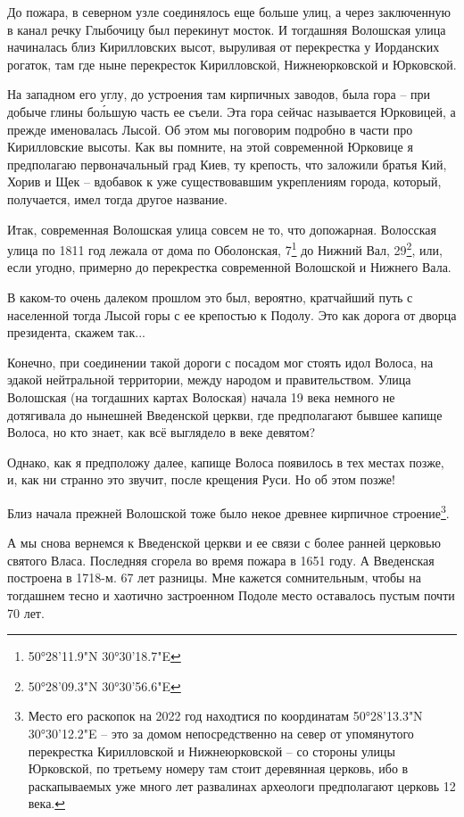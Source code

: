 До пожара, в северном узле соединялось еще больше улиц, а через заключенную в канал речку Глыбочицу был перекинут мосток. И тогдашняя Волошская улица начиналась близ Кирилловских высот, выруливая от перекрестка у Иорданских рогаток, там где ныне перекресток Кирилловской, Нижнеюрковской и Юрковской.

На западном его углу, до устроения там кирпичных заводов, была гора – при добыче глины бо\'льшую часть ее съели. Эта гора сейчас называется Юрковицей, а прежде именовалась Лысой. Об этом мы поговорим подробно в части про Кирилловские высоты. Как вы помните, на этой современной Юрковице я предполагаю первоначальный град Киев, ту крепость, что заложили братья Кий, Хорив и Щек – вдобавок к уже существовавшим укреплениям города, который, получается, имел тогда другое название.

Итак, современная Волошская улица совсем не то, что допожарная. Волосская улица по 1811 год лежала от дома по Оболонская, 7\footnote{50°28'11.9"N 30°30'18.7"E} до Нижний Вал, 29\footnote{50°28'09.3"N 30°30'56.6"E}, или, если угодно, примерно до перекрестка современной Волошской и Нижнего Вала.

В каком-то очень далеком прошлом это был, вероятно, кратчайший путь с населенной тогда Лысой горы с ее крепостью к Подолу. Это как дорога от дворца президента, скажем так...

Конечно, при соединении такой дороги с посадом мог стоять идол Волоса, на эдакой нейтральной территории, между народом и правительством. Улица Волошская (на тогдашних картах Волоская) начала 19 века немного не дотягивала до нынешней Введенской церкви, где предполагают бывшее капище Волоса, но кто знает, как всё выглядело в веке девятом?

Однако, как я предположу далее, капище Волоса появилось в тех местах позже, и, как ни странно это звучит, после крещения Руси. Но об этом позже!

Близ начала прежней Волошской тоже было некое древнее кирпичное строение\footnote{Место его раскопок на 2022 год находтися по координатам
50°28'13.3"N 30°30'12.2"E – это за домом непосредственно на север от упомянутого перекрестка Кирилловской и Нижнеюрковской – со стороны улицы Юрковской, по третьему номеру там стоит деревянная церковь, ибо в раскапываемых уже много лет развалинах археологи предполагают церковь 12 века.}. 

А мы снова вернемся к Введенской церкви и ее связи с более ранней церковью святого Власа. Последняя сгорела во время пожара в 1651 году. А Введенская построена в 1718-м. 67 лет разницы. Мне кажется сомнительным, чтобы на тогдашнем тесно и хаотично застроенном Подоле место оставалось пустым почти 70 лет. 

